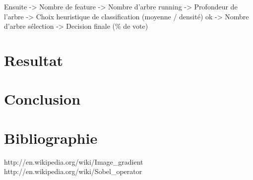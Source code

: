 \documentclass[11pt,a4paper]{report}
\begin{document}
Ensuite 
-> Nombre de feature
-> Nombre d'arbre    running
-> Profondeur de l'arbre
-> Choix heuristique de classification (moyenne / densité)  ok 
-> Nombre d'arbre sélection
-> Decision finale (\% de vote)

\section{Resultat}

\section{Conclusion}
	
	
\section{Bibliographie}	
\begin{thebibliography}{2}
    http://en.wikipedia.org/wiki/Image\_gradient
    http://en.wikipedia.org/wiki/Sobel\_operator
  
\end{thebibliography}
\end{document}
